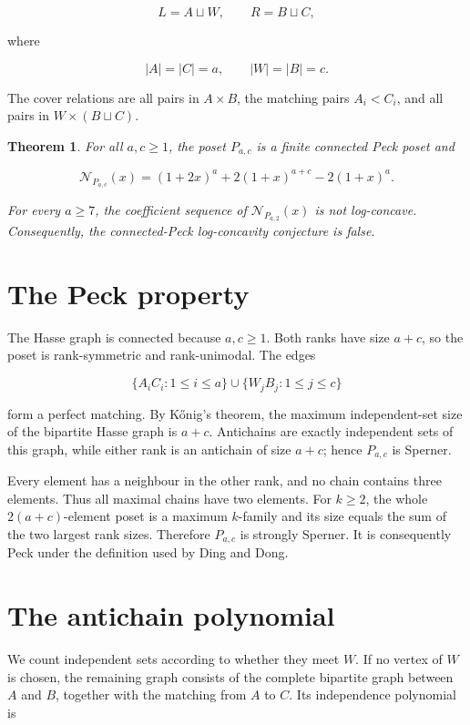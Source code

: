 \documentclass[11pt]{article}
\newtheorem{theorem}{Theorem}
\numberwithin{equation}{section}
\begin{document}
\[
L=A\sqcup W,\qquad R=B\sqcup C,
\]

where

\[
|A|=|C|=a,\qquad |W|=|B|=c.
\]

The cover relations are all pairs in $A\times B$, the matching pairs $A_i<C_i$, and all pairs in
$W\times(B\sqcup C)$.

\begin{theorem}


For all $a,c\geq 1$, the poset $P_{a,c}$ is a finite connected Peck poset and

\[
\mathcal N_{P_{a,c}}(x)=(1+2x)^a+2(1+x)^{a+c}-2(1+x)^a.
\tag{1}
\]

For every $a\geq 7$, the coefficient sequence of $\mathcal N_{P_{a,2}}(x)$ is not log-concave.
Consequently, the connected-Peck log-concavity conjecture is false.

\end{theorem}

\section{The Peck property}


The Hasse graph is connected because $a,c\geq 1$. Both ranks have size $a+c$, so the poset is
rank-symmetric and rank-unimodal. The edges

\[
\{A_iC_i:1\leq i\leq a\}\cup\{W_jB_j:1\leq j\leq c\}
\]

form a perfect matching. By K\H{o}nig's theorem, the maximum independent-set size of the bipartite
Hasse graph is $a+c$. Antichains are exactly independent sets of this graph, while either rank is
an antichain of size $a+c$; hence $P_{a,c}$ is Sperner.

Every element has a neighbour in the other rank, and no chain contains three elements. Thus all
maximal chains have two elements. For $k\geq 2$, the whole $2(a+c)$-element poset is a maximum
$k$-family and its size equals the sum of the two largest rank sizes. Therefore $P_{a,c}$ is
strongly Sperner. It is consequently Peck under the definition used by Ding and Dong.

\section{The antichain polynomial}


We count independent sets according to whether they meet $W$. If no vertex of $W$ is chosen, the
remaining graph consists of the complete bipartite graph between $A$ and $B$, together with the
matching from $A$ to $C$. Its independence polynomial is
\end{document}
